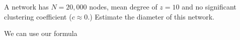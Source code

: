

A network has  $N=20,000$ nodes, mean degree of $z=10$ and no significant clustering coefficient ($c\approx 0$.) Estimate the diameter of this network. 

\solution
We can use our formula
